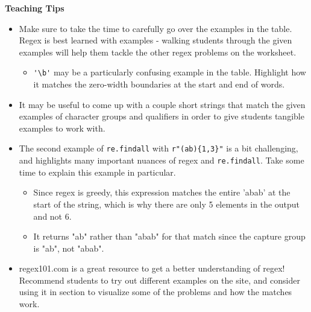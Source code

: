 \begin{guide}
\begin{blocksection}
\textbf{Teaching Tips}
    \begin{itemize}
        \item Make sure to take the time to carefully go over the examples in the table. Regex is best learned with examples - walking students through the given examples will help them tackle the other regex problems on the worksheet.
        \begin{itemize}
            \item \lstinline{'\b'} may be a particularly confusing example in the table. Highlight how it matches the zero-width boundaries at the start and end of words.
        \end{itemize}
        \item It may be useful to come up with a couple short strings that match the given examples of character groups and qualifiers in order to give students tangible examples to work with.
        \item The second example of \lstinline{re.findall} with \lstinline$r"(ab){1,3}"$ is a bit challenging, and highlights many important nuances of regex and \lstinline{re.findall}. Take some time to explain this example in particular.
        \begin{itemize}
            \item Since regex is greedy, this expression matches the entire 'abab' at the start of the string, which is why there are only 5 elements in the output and not 6.
            \item It returns "ab" rather than "abab" for that match since the capture group is "ab", not "abab". 
        \end{itemize}
        \item regex101.com is a great resource to get a better understanding of regex! Recommend students to try out different examples on the site, and consider using it in section to visualize some of the problems and how the matches work.
    \end{itemize}
\end{blocksection}
\end{guide}
    